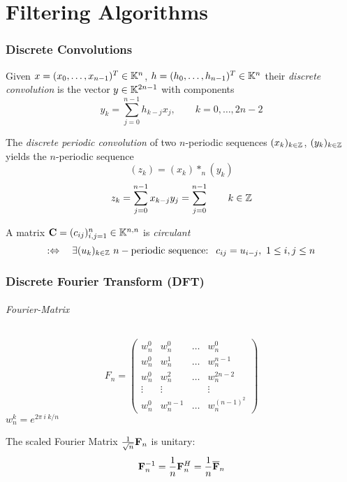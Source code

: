 \clearpage
\part{Filtering Algorithms}
\section{Discrete Convolutions}
	\begin{definition}
	 Given $x = (x_0,\ldots, x_{n-1})^T \in \mathbb{K}^n$, $h = (h_0, \ldots, h_{n-1})^T \in \mathbb{K}^n$ their \emph{discrete convolution} is the vector $y \in \mathbb{K}^{2n-1}$ with components
	 \[
	  y_k = \sum_{j=0}^{n-1} h_{k-j}x_j,\qquad k = 0, \ldots, 2n-2
	 \]
	\end{definition}
	
	\begin{definition}
	 The \emph{discrete periodic convolution} of two $n$-periodic sequences $(x_k)_{k\in \mathbb{Z}}$, $(y_k)_{k\in \mathbb{Z}}$ yields the $n$-periodic sequence
	 \[
	  (z_k) = (x_k) \ast_n (y_k) 
	 \]
	 \[
	  z_k = \sum_{j=0}^{n-1} x_{k-j}y_j = \sum_{j=0}^{n-1} \qquad k \in \mathbb{Z}
	 \]
	\end{definition}
	
	\begin{definition}
	A matrix $\mathbf{C} = (c_{ij})_{i,j=1}^n \in \mathbb{K}^{n,n}$ is \emph{circulant}
		\[
		 :\Leftrightarrow \quad \exists (u_k)_{k\in \Z} \ n-\text{periodic sequence: }\ c_{ij} = u_{i-j},\ 1 \leq i,j \leq n
		\]

	\end{definition}

\section{Discrete Fourier Transform (DFT)}
	\paragraph{Fourier-Matrix}
		\[
		 F_n = \begin{pmatrix}
		        w_n^0 & w_n^0 & \ldots & w_n^0\\
		        w_n^0 & w_n^1 & \ldots & w_n^{n-1}\\
		        w_n^0 & w_n^2 & \ldots & w_n^{2n-2}\\
		        \vdots &\vdots&		   & \vdots\\
		        w_n^0 & w_n^{n-1} & \ldots & w_n^{(n-1)^2}
		       \end{pmatrix}
		\]
		$w_n^k = e^{2\pi\ i\ k/n}$
	\begin{lemma}
	 The scaled Fourier Matrix $\frac{1}{\sqrt{n}}\mathbf{F}_n$ is unitary:
	 \[
	  \mathbf{F}_n^{-1} = \frac{1}{n}\mathbf{F}_n^H = \frac{1}{n} \overline{\mathbf{F}}_n
	 \]
	\end{lemma}
	

